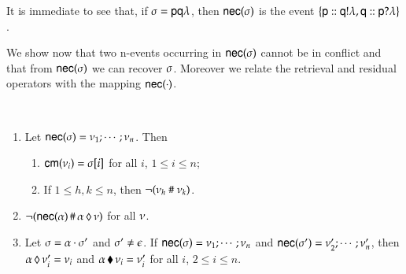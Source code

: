   It is immediate to see that, if $\sigma={\sf p}{\sf q}\lambda$, then
  ${\sf nec}(\sigma)$ is the event
  $\{{\sf p}:: {\sf q}!\lambda,{\sf q}:: {\sf p}?\lambda\}$.

\bigskip
%
 We show now that two n-events occurring in ${\sf nec}(\sigma)$ cannot be in conflict  and that from ${\sf nec}(\sigma)$ we can recover $\sigma$. Moreover we relate the retrieval and residual operators with the mapping ${\sf nec}(\cdot)$. 

\begin{lemma}\text{~}\\[-10pt]
\begin{enumerate}
\item{} Let
  ${\sf nec}(\sigma)=\nu_1;\cdots;\nu_n$.  Then 
\begin{enumerate}
 \item{} ${\sf cm}(\nu_i)=\sigma[i]$  for all $i$, $1\leq i\leq n$;
\item{} If $1\leq h,k\leq n$, then $\neg(\nu_h~\#~\nu_k)$.
  \end{enumerate}
\item{} $\neg({\sf nec}(\alpha)\,\#\,{\alpha}\,\lozenge\,{\nu})$ for all $\nu$.
\item{} Let $\sigma=\alpha\cdot\sigma'$ and
  $\sigma'\neq \epsilon$.  If
  ${\sf nec}(\sigma)=\nu_1;\cdots;\nu_n$ and
  ${\sf nec}(\sigma')=\nu'_2;\cdots;\nu'_n$, then
  ${\alpha}\,\lozenge\,{\nu'_i}=\nu_i$ and
  ${\alpha}\,\blacklozenge\,{\nu_i}=\nu_i'$ for all $i$, $2\leq i\leq n$.
 \end{enumerate}
  \end{lemma}
%

